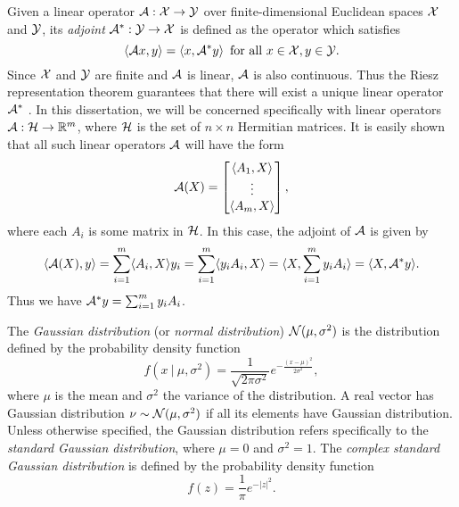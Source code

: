 Given a linear operator ${\mathcal A} : {\mathcal X} \rightarrow {\mathcal Y}$ over finite-dimensional Euclidean spaces ${\mathcal X}$ and ${\mathcal Y}$, its \textit{adjoint} ${\mathcal A}^* : {\mathcal Y} \rightarrow {\mathcal X}$ is defined as the operator which satisfies 
\begin{equation}			\label{Def:adjoint_operator}
\langle {\mathcal A} x, y \rangle = \langle x, {\mathcal A}^* y \rangle \hspace{5pt} \text{for all } x \in {\mathcal X}, y \in {\mathcal Y}. 
\end{equation} 
Since ${\mathcal X}$ and ${\mathcal Y}$ are finite and ${\mathcal A}$ is linear, ${\mathcal A}$ is also continuous.  Thus the Riesz representation theorem guarantees that there will exist a unique linear operator ${\mathcal A}^*$ \cite[Section 6.2]{reed1980functional}.  In this dissertation, we will be concerned specifically with linear operators ${\mathcal A}: {\mathcal H} \rightarrow {\mathbb R}^m$, where ${\mathcal H}$ is the set of $n \times n$ Hermitian matrices.  It is easily shown that all such linear operators ${\mathcal A}$ will have the form
\begin{equation}
{\mathcal A}(X) = \begin{bmatrix}
\langle A_1, X \rangle	\\
\vdots	\\
\langle A_m, X \rangle
\end{bmatrix},
\end{equation}
where each $A_i$ is some matrix in ${\mathcal H}$.  In this case, the adjoint of ${\mathcal A}$ is given by 
\begin{equation}
\langle {\mathcal A}(X), y \rangle  	= \sum_{i=1}^m \langle A_i, X \rangle y_i	  = \sum_{i=1}^m \langle y_iA_i, X \rangle   = \langle X, \sum_{i=1}^m  y_iA_i \rangle = \langle X, {\mathcal A}^*y \rangle.
\end{equation}
Thus we have ${\mathcal A}^*y = \sum_{i=1}^m  y_iA_i$.


The \textit{Gaussian distribution} (or \textit{normal distribution}) ${\mathcal N}(\mu, \sigma^2)$ is the distribution defined by the probability density function
\begin{equation} 			\label{Def:Gaussian_distribution}
f\left(x \ | \ \mu, \sigma^2\right) = \frac{1}{\sqrt{2\pi \sigma^2}}e^{-\frac{(x-\mu)^2}{2\sigma^2}},
\end{equation}
where $\mu$ is the mean and $\sigma^2$ the variance of the distribution.  A real vector has Gaussian distribution $\nu \sim {\mathcal N}(\mu, \sigma^2)$ if all its elements have Gaussian distribution.  Unless otherwise specified, the Gaussian distribution refers specifically to the \textit{standard Gaussian distribution}, where $\mu = 0$ and $\sigma^2 = 1$.  The \textit{complex standard Gaussian distribution} is defined by the probability density function
\begin{equation} 			\label{Def:Gaussian_distribution_complex}
f(z) = \frac{1}{\pi}e^{-|z|^2}.
\end{equation}


